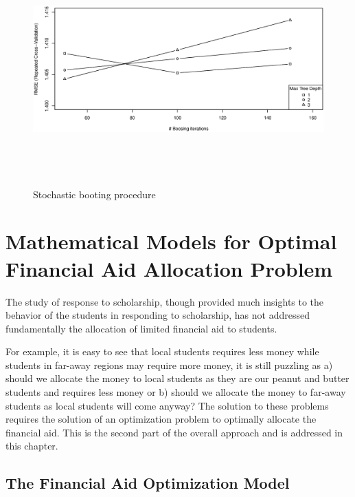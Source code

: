 \documentclass[12pt,english]{report}
\begin{document}
\begin{figure}[ht]
   \centering
\includegraphics[width=5in,
height=3.5in,scale=0.5]{pic/Stochastic_boositing.eps}
 \caption{Stochastic booting procedure}
 \label{boosting}
\end{figure}



\chapter{Mathematical Models for Optimal Financial Aid  Allocation Problem }

The study of response to scholarship, though provided much insights to the
behavior of the students in responding to scholarship, has not addressed
fundamentally the allocation of limited financial aid to students.

For example, it is easy to see that local students requires less money while
students in far-away regions may require more money, it is still puzzling as a)
should we allocate the money to local students as they are our peanut and
butter students and requires less money or b) should we allocate the money to
far-away students as local students will come anyway? The solution to these
problems requires the solution of an optimization problem to optimally allocate
the financial aid.  This is the second part of the overall approach and is
addressed in this chapter.



\section{The Financial Aid Optimization Model}
\end{document}
